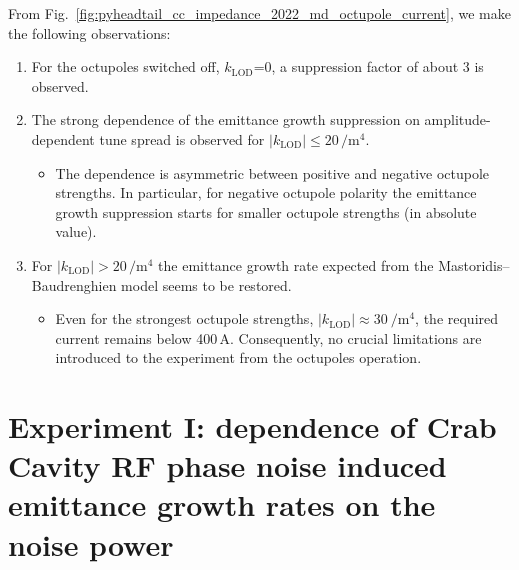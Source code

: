 From Fig.~\ref{fig:pyheadtail_cc_impedance_2022_md_octupole_current}, we make the following observations:
\begin{enumerate}
   \item For the octupoles switched off, $k_\mathrm{LOD}$=0, a suppression factor of about 3 is observed.
   \item The strong dependence of the emittance growth suppression on amplitude-dependent tune spread is observed for $|k_\mathrm{LOD}| \leq 20$\,$\mathrm{/m^4}$.
      \begin{itemize}
         \item The dependence is asymmetric between positive and negative octupole strengths. In particular, for negative octupole polarity the emittance growth suppression starts for smaller octupole strengths (in absolute value).
      \end{itemize}
   \item For $|k_\mathrm{LOD}| > 20$\,$\mathrm{/m^4}$ the emittance growth rate expected from the Mastoridis--Baudrenghien model seems to be restored. 
      \begin{itemize}
         \item Even for the strongest octupole strengths, $| k_\mathrm{LOD} |\approx 30 \ \mathrm{/m^4}$, the required current remains below 400\,A. Consequently, no crucial limitations are introduced to the experiment from the octupoles operation.
      \end{itemize}
\end{enumerate}


\section{Experiment I: dependence of Crab Cavity RF phase noise induced emittance growth rates on the noise power}\label{subsec:cc_md_2022_noise_scan} 

